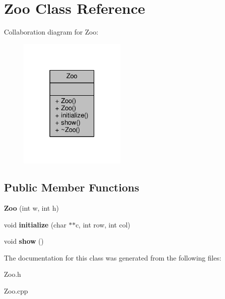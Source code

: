 \hypertarget{classZoo}{}\section{Zoo Class Reference}
\label{classZoo}


Collaboration diagram for Zoo\+:
\nopagebreak
\begin{figure}[H]
\begin{center}
\leavevmode
\includegraphics[width=147pt]{classZoo__coll__graph}
\end{center}
\end{figure}
\subsection*{Public Member Functions}
\begin{DoxyCompactItemize}
\item 
{\bfseries Zoo} (int w, int h)\hypertarget{classZoo_a5e4518eccc8e44d23c4b0f37e7e503cc}{}\label{classZoo_a5e4518eccc8e44d23c4b0f37e7e503cc}

\item 
void {\bfseries initialize} (char $\ast$$\ast$c, int row, int col)\hypertarget{classZoo_a8236fa2a39cd2c6c4535d638d2edee1c}{}\label{classZoo_a8236fa2a39cd2c6c4535d638d2edee1c}

\item 
void {\bfseries show} ()\hypertarget{classZoo_aed92b968c2bb9dd83993cc7707b1b6b9}{}\label{classZoo_aed92b968c2bb9dd83993cc7707b1b6b9}

\end{DoxyCompactItemize}


The documentation for this class was generated from the following files\+:\begin{DoxyCompactItemize}
\item 
Zoo.\+h\item 
Zoo.\+cpp\end{DoxyCompactItemize}
